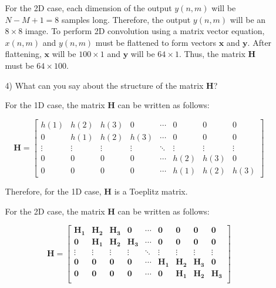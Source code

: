 \documentclass[fleqn]{article}
\begin{document}
\begin{enumerate}
\begin{enumerate}
			For the 2D case, each dimension of the output $y(n,m)$ will be $N - M + 1 = 8$ samples long. Therefore, the output $y(n,m)$ will be an $8 \times 8$ image. To perform 2D convolution using a matrix vector equation, $x(n,m)$ and $y(n,m)$ must be flattened to form vectors $\mathbf{x}$ and $\mathbf{y}$. After flattening, $\mathbf{x}$ will be $100 \times 1$ and $\mathbf{y}$ will be $64 \times 1$. Thus, the matrix $\mathbf{H}$ must be $64 \times 100$.
			
			\item[4)] What can you say about the structure of the matrix $\mathbf{H}$?
			
			For the 1D case, the matrix $\mathbf{H}$ can be written as follows:
			
			\begin{equation*}
				\mathbf{H} = \begin{bmatrix}
					h(1)   & h(2)   & h(3)   & 0      & \cdots & 0      & 0      & 0 \\
					0      & h(1)   & h(2)   & h(3)   & \cdots & 0      & 0      & 0 \\
					\vdots & \vdots & \vdots & \vdots & \ddots & \vdots & \vdots & \vdots \\
					0      & 0      & 0      & 0      & \cdots & h(2)   & h(3)   & 0 \\
					0      & 0      & 0      & 0      & \cdots & h(1)   & h(2)   & h(3)
				\end{bmatrix}
			\end{equation*}
				
			Therefore, for the 1D case, $\mathbf{H}$ is a Toeplitz matrix.
			
			For the 2D case, the matrix $\mathbf{H}$ can be written as follows:
			
			\begin{equation*}
				\mathbf{H} = \begin{bmatrix}
					\mathbf{H_1} & \mathbf{H_2} & \mathbf{H_3} & \mathbf{0}   & \cdots & \mathbf{0}   & \mathbf{0}   & \mathbf{0}   & \mathbf{0} \\
					\mathbf{0}   & \mathbf{H_1} & \mathbf{H_2} & \mathbf{H_3} & \cdots & \mathbf{0}   & \mathbf{0}   & \mathbf{0}   & \mathbf{0} \\
					\vdots       & \vdots       & \vdots       & \vdots       & \ddots & \vdots       & \vdots       & \vdots       & \vdots     \\
					\mathbf{0}   & \mathbf{0}   & \mathbf{0}   & \mathbf{0}   & \cdots & \mathbf{H_1} & \mathbf{H_2} & \mathbf{H_3} & \mathbf{0} \\
					\mathbf{0}   & \mathbf{0}   & \mathbf{0}   & \mathbf{0}   & \cdots & \mathbf{0}   & \mathbf{H_1} & \mathbf{H_2} & \mathbf{H_3} \\
				\end{bmatrix}
			\end{equation*}
			

\end{enumerate}
\end{enumerate}
\end{document}

